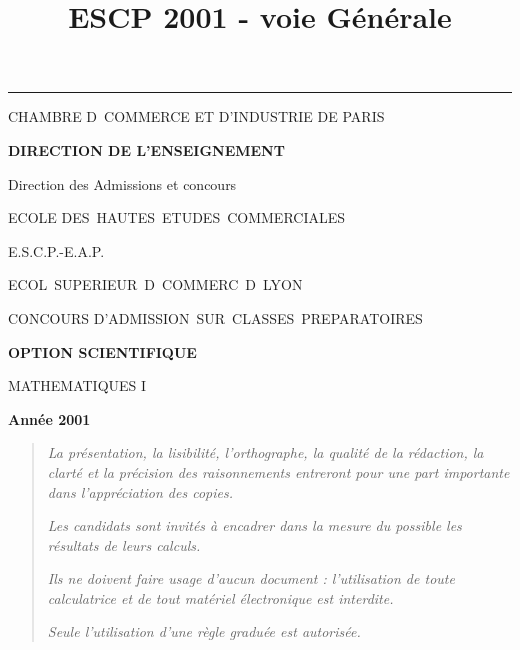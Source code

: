 \documentclass[11pt]{article}%
\title{\bf \vspace{-2cm} ESCP 2001 - voie Générale} %
\author{} %
\date{} %
\begin{document}
\maketitle %
\vspace{-1.4cm}\hrule %
\thispagestyle{fancy}

\vspace*{.2cm}




\begin{center}
{\small CHAMBRE D\E\ COMMERCE ET D'INDUSTRIE DE PARIS}

\textbf{DIRECTION DE L'ENSEIGNEMENT}

Direction des Admissions et concours

\underline{\hspace*{3cm}}

{\Large ECOLE DES\ HAUTES\ ETUDES\ COMMERCIALES}

{\Large E.S.C.P.-E.A.P.}

{\Large ECOL\E\ SUPERIEUR\E\ D\E\ COMMERC\E\ D\E\ LYON}{\large }

CONCOURS D'ADMISSION\ SUR\ CLASSES\ PREPARATOIRES

\underline{\hspace*{3cm}}

\textbf{OPTION SCIENTIFIQUE}

{\Large MATHEMATIQUES I}

\textbf{Année 2001}

\underline{\hspace*{3cm}}
\end{center}

\begin{quotation}
\noindent \textsl{La présentation, la lisibilité, l'orthographe, la
qualité
de la rédaction, la clarté et la précision des raisonnements entreront
pour
une part importante dans l'appréciation des copies.}

\noindent \textsl{Les candidats sont invités à encadrer dans la mesure
du
possible les résultats de leurs calculs.}

\noindent \textsl{Ils ne doivent faire usage d'aucun document :
l'utilisation de toute calculatrice et de tout matériel électronique
est
interdite.}

\noindent \textsl{Seule l'utilisation d'une règle graduée est
autorisée.}

\noindent \textsl{\hrulefill }
\end{quotation}
\end{document}

